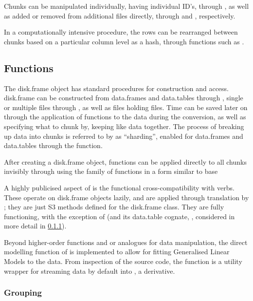 Chunks can be manipulated individually, having individual ID's, through , as well as added or removed from additional  files directly, through  and , respectively.

In a computationally intensive procedure, the rows can be rearranged between chunks based on a particular column level as a hash, through functions such as .

\subsection{Functions}\label{sec:functions}

The disk.frame object has standard procedures for construction and access.
disk.frame can be constructed from data.frames and data.tables
through , single or
multiple  files through
, as well as 
files holding  files.
Time can be saved later on through the application of functions to the data during the conversion, as well as specifying what to chunk by, keeping like data together.
The process of breaking up data into chunks is referred to by  as ``sharding'', enabled for data.frames and data.tables through the  function.

After creating a disk.frame object, functions can be applied directly to all chunks invisibly through using the  family of functions in a form similar to base \R{} 

A highly publicised aspect of  is the functional cross-compatibility with  verbs.
These operate on disk.frame objects lazily, and are applied through translation by ; they are just S3 methods defined for the disk.frame class.
They are fully functioning, with the exception of  (and its data.table cognate, , considered in more detail in \cref{sec:spec-cons-group-by}).

Beyond higher-order functions and  or  analogues for data manipulation, the direct modelling function of  is implemented to allow for fitting Generalised Linear Models to the data.
From inspection of the source code, the function is a utility wrapper for streaming  data by default into , a  derivative.

\subsubsection{Grouping}\label{sec:spec-cons-group-by}

